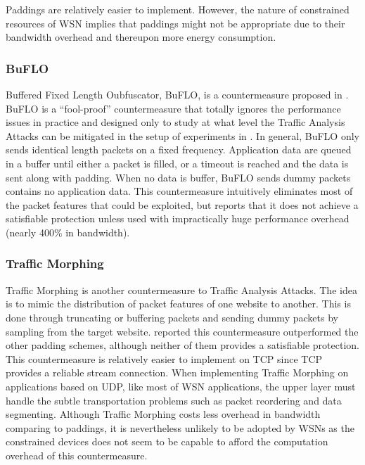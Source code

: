 Paddings are relatively easier to implement. However, the nature of constrained resources of WSN implies that paddings might not be appropriate due to their bandwidth overhead and thereupon more energy consumption.

\subsubsection{BuFLO}

Buffered Fixed Length Oubfuscator, BuFLO, is a countermeasure proposed in \cite{Peekaboo}. BuFLO is a ``fool-proof''\cite{Peekaboo} countermeasure that totally ignores the performance issues in practice and designed only to study at what level the Traffic Analysis Attacks can be mitigated in the setup of experiments in \cite{Peekaboo}. In general, BuFLO only sends identical length packets on a fixed frequency. Application data are queued in a buffer until either a packet is filled, or a timeout is reached and the data is sent along with padding. When no data is buffer, BuFLO sends dummy packets contains no application data. This countermeasure intuitively eliminates most of the packet features that could be exploited, but \cite{Peekaboo} reports that it does not achieve a satisfiable protection unless used with impractically huge performance  overhead (nearly 400\% in bandwidth).

\subsubsection{Traffic Morphing}

Traffic Morphing\cite{TrafficMorphing} is another countermeasure to Traffic Analysis Attacks. The idea is to mimic the distribution of packet features of one website to another. This is done through truncating or buffering packets and sending dummy packets by sampling from the target website. \cite{Peekaboo} reported this countermeasure outperformed the other padding schemes, although neither of them provides a satisfiable protection. This countermeasure is relatively easier to implement on TCP since TCP provides a reliable stream connection. When implementing Traffic Morphing on applications based on UDP, like most of WSN applications, the upper layer must handle the subtle transportation problems such as packet reordering and data segmenting. Although Traffic Morphing costs less overhead in bandwidth comparing to paddings, it is nevertheless unlikely to be adopted by WSNs as the constrained devices does not seem to be capable to afford the computation overhead of this countermeasure.

